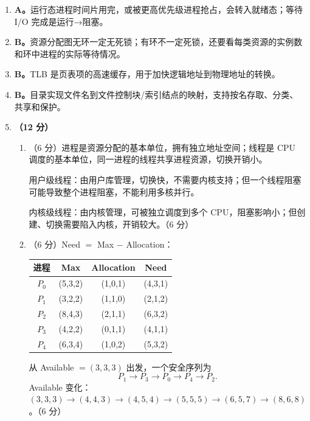 \documentclass[a4paper,11pt]{article}
\begin{document}

\begin{enumerate}[start=8, label=\textbf{\arabic*.}, leftmargin=2.4em, itemsep=0.45em]

\item \textbf{A。}运行态进程时间片用完，或被更高优先级进程抢占，会转入就绪态；等待 I/O 完成是运行→阻塞。

\item \textbf{B。}资源分配图无环一定无死锁；有环不一定死锁，还要看每类资源的实例数和环中进程的实际等待情况。

\item \textbf{B。}TLB 是页表项的高速缓存，用于加快逻辑地址到物理地址的转换。

\item \textbf{B。}目录实现文件名到文件控制块/索引结点的映射，支持按名存取、分类、共享和保护。

\item \textbf{（12 分）}
\begin{enumerate}[label=（\arabic*）, leftmargin=2.2em, itemsep=2pt]
  \item （6 分）进程是资源分配的基本单位，拥有独立地址空间；线程是 CPU 调度的基本单位，同一进程的线程共享进程资源，切换开销小。
  
  用户级线程：由用户库管理，切换快，不需要内核支持；但一个线程阻塞可能导致整个进程阻塞，不能利用多核并行。
  
  内核级线程：由内核管理，可被独立调度到多个 CPU，阻塞影响小；但创建、切换需要陷入内核，开销较大。\hfill（6 分）

  \item （6 分）Need $=$ Max $-$ Allocation：
  \begin{center}\small
  \begin{tabular}{cccc}
  \toprule
  进程 & Max & Allocation & Need \\
  \midrule
  $P_0$ & (5,3,2) & (1,0,1) & (4,3,1) \\
  $P_1$ & (3,2,2) & (1,1,0) & (2,1,2) \\
  $P_2$ & (8,4,3) & (2,1,1) & (6,3,2) \\
  $P_3$ & (4,2,2) & (0,1,1) & (4,1,1) \\
  $P_4$ & (6,3,4) & (1,0,2) & (5,3,2) \\
  \bottomrule
  \end{tabular}
  \end{center}
  从 Available $=(3,3,3)$ 出发，一个安全序列为
  \[
  P_1\to P_3\to P_0\to P_4\to P_2.
  \]
  Available 变化：$(3,3,3)\to(4,4,3)\to(4,5,4)\to(5,5,5)\to(6,5,7)\to(8,6,8)$。\hfill（6 分）
\end{enumerate}

\end{enumerate}
\end{document}
